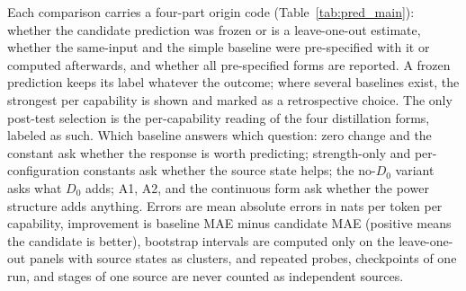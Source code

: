 Each comparison carries a four-part origin code (Table~\ref{tab:pred_main}):
whether the candidate prediction was frozen or is a leave-one-out
estimate, whether the same-input and the simple baseline were
pre-specified with it or computed afterwards, and whether all
pre-specified forms are reported. A frozen prediction keeps its label
whatever the outcome; where several baselines exist, the strongest per
capability is shown and marked as a retrospective choice. The only
post-test selection is the per-capability reading of the four
distillation forms, labeled as such. Which baseline answers which
question: zero change and the constant ask whether the response is
worth predicting; strength-only and per-configuration constants ask
whether the source state helps; the no-$D_0$ variant asks what $D_0$
adds; A1, A2, and the continuous form ask whether the power structure
adds anything. Errors are mean absolute errors in nats per token per
capability, improvement is baseline MAE minus candidate MAE (positive
means the candidate is better), bootstrap intervals are computed only
on the leave-one-out panels with source states as clusters, and
repeated probes, checkpoints of one run, and stages of one source are
never counted as independent sources.
